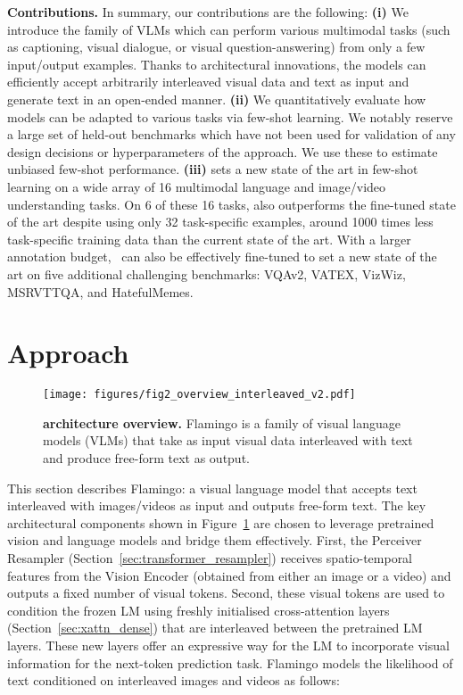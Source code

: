 \noindent
\textbf{Contributions.}
In summary, our contributions are the following:
\textbf{(i)} We introduce the \method{} family of VLMs which can perform various multimodal tasks (such as captioning, visual dialogue, or visual question-answering) from only a few input/output examples.
Thanks to architectural innovations, the \method{} models can efficiently accept arbitrarily interleaved visual data and text as input and generate text in an open-ended manner. \textbf{(ii)} We quantitatively evaluate how~\method{} models can be adapted to various tasks via few-shot learning. We notably reserve a large set of held-out benchmarks which have not been used for validation of any design decisions or  hyperparameters of the approach. 
We use these to estimate unbiased few-shot performance.
\textbf{(iii)} \largem{} sets a new state of the art in few-shot learning on a wide array of 16 multimodal language and image/video understanding tasks.
On 6 of these 16 tasks, \largem{} also outperforms the fine-tuned state of the art despite using only 32 task-specific examples, around 1000 times less task-specific training data than the current state of the art.
With a larger annotation budget,~\largem{} can also be effectively fine-tuned to set a new state of the art on five additional challenging benchmarks: VQAv2, VATEX, VizWiz, MSRVTTQA, and HatefulMemes.







\section{Approach}
\label{sec:approach}

\begin{figure}[t!]
\texttt{[image: figures/fig2\_overview\_interleaved\_v2.pdf]}
\centering
\caption{\capfontsize{} \textbf{\method{} architecture overview.} Flamingo is a family of visual language models (VLMs) that take as input visual data interleaved with text and  produce free-form text as output. 
}
\label{fig:overview}
\end{figure}

This section describes Flamingo: a visual language model that accepts text interleaved with images/videos as input and outputs free-form text. The key architectural components shown in Figure~\ref{fig:overview}
are chosen to leverage pretrained vision and language models and bridge them effectively. 
First, the Perceiver Resampler (Section~\ref{sec:transformer_resampler}) receives spatio-temporal features from the Vision Encoder (obtained from either an image or a video) and outputs a fixed number of visual tokens.
Second, these visual tokens are used to condition the frozen LM using freshly initialised cross-attention layers (Section~\ref{sec:xattn_dense}) that are interleaved between the pretrained LM layers.
These new layers offer an expressive way for the LM to incorporate visual information for the next-token prediction task. Flamingo models the likelihood of text  conditioned on interleaved  images and videos  as follows:

